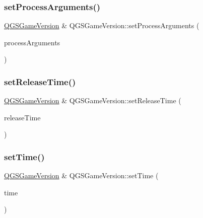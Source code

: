 \mbox{\label{class_q_g_s_game_version_adbb9d573d730ac3b84d5dd647c084d61}} 
\subsubsection{\texorpdfstring{set\+Process\+Arguments()}{setProcessArguments()}}
{\footnotesize\ttfamily \mbox{\hyperlink{class_q_g_s_game_version}{Q\+G\+S\+Game\+Version}} \& Q\+G\+S\+Game\+Version\+::set\+Process\+Arguments (\begin{DoxyParamCaption}\item[{const Q\+String \&}]{process\+Arguments }\end{DoxyParamCaption})}

\mbox{\label{class_q_g_s_game_version_ae0ea530cc81e7bb3617707e539ef8a76}} 
\subsubsection{\texorpdfstring{set\+Release\+Time()}{setReleaseTime()}}
{\footnotesize\ttfamily \mbox{\hyperlink{class_q_g_s_game_version}{Q\+G\+S\+Game\+Version}} \& Q\+G\+S\+Game\+Version\+::set\+Release\+Time (\begin{DoxyParamCaption}\item[{const Q\+String \&}]{release\+Time }\end{DoxyParamCaption})}

\mbox{\label{class_q_g_s_game_version_a77397892df9a9a9e6592bf8ad72894ce}} 
\subsubsection{\texorpdfstring{set\+Time()}{setTime()}}
{\footnotesize\ttfamily \mbox{\hyperlink{class_q_g_s_game_version}{Q\+G\+S\+Game\+Version}} \& Q\+G\+S\+Game\+Version\+::set\+Time (\begin{DoxyParamCaption}\item[{const Q\+String \&}]{time }\end{DoxyParamCaption})}

